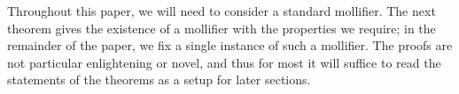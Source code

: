 \documentclass[12pt,reqno]{article}
\numberwithin{equation}{section}
\newtheorem{remark}{Remark}
\DeclareMathOperator{\EE}{\mathbf{E}}
\newcommand{\psitwo}[1]{\| {#1} \|_{\psi_2(L)}}
\begin{document}
\begin{itemize}
\begin{comment}
    
    
        \item If $X_1, \dots, X_N$ are \emph{independent}, then
        \[ \psitwo{X_1 + \dots + X_N} \leq 10 \left( \psitwo{X_1}^2 + \dots + \psitwo{X_N}^2 \right)^{1/2}. \]
        This is an equivalent way to state \emph{Hoeffding's Inequality}, and we refer to an application of this inequality as an application of Hoeffding's inequality.
    \end{itemize}
    Roughly speaking, if $X$ is a random variable with $\psitwo{X} \leq A$, we can think of $X$ as being sharply concentrated in the region $[-A,A]$. The Orlicz norm thus provides a convenient way to quantify concentration phenomena.
    \begin{remark}
        The constants involved in these statements are suboptimal, but will suffice for our purposes. Proofs can be found in Chapter 2 of \cite{Vershynin}.
    \end{remark}

    \end{comment}
\end{itemize}

Throughout this paper, we will need to consider a standard mollifier. The next theorem gives the existence of a mollifier with the properties we require; in the remainder of the paper, we fix a single instance of such a mollifier. The proofs are not particular enlightening or novel, and thus for most it will suffice to read the statements of the theorems as a setup for later sections.
\end{document}
